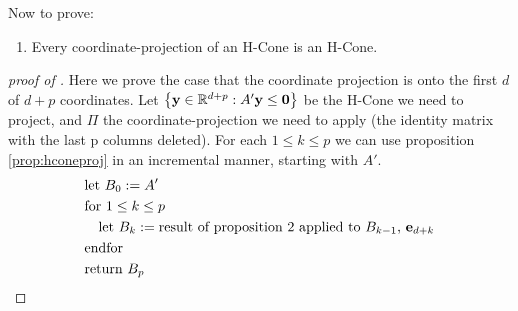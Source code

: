 Now to prove:
\begin{enumerate}
  \item[\Vproj] Every coordinate-projection of an H-Cone is an H-Cone.
\end{enumerate}

\begin{proof}[proof of \Vproj]
  Here we prove the case that the coordinate projection is onto the first $d$ of $d+p$ coordinates.  Let $\left\{\mathbf{y}\in\mathbb{R}^{d+p}:A'\mathbf{y} \leq \mathbf{0}\right\}$ be the H-Cone we need to project, and $\Pi$ the coordinate-projection we need to apply (the identity matrix with the last p columns deleted).  For each $1 \leq k \leq p$ we can use proposition \ref{prop:hconeproj} in an incremental manner, starting with $A'$.
\begin{align*}
  &\text{let } B_0 := A'\\
  &\text{for } 1 \leq k \leq p \\
  &\quad \text{let } B_k := 
         \text{result of proposition 2 applied to $B_{k-1}$, $\mathbf{e}_{d+k}$} \\
  &\text{endfor} \\
  &\text{return } B_p
\end{align*}



\end{proof}
